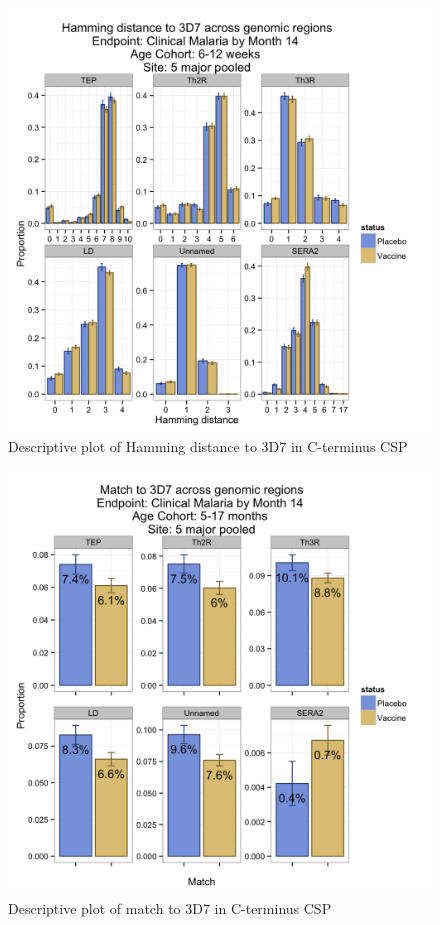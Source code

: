 \documentclass[]{article}
\begin{document}
\begin{figure}[htbp]
\centering
\includegraphics{figures/hamming-newborn-c-1.png}
\caption{Descriptive plot of Hamming distance to 3D7 in C-terminus CSP}
\end{figure}

\begin{figure}[htbp]
\centering
\includegraphics{figures/match-infant-c-1.png}
\caption{Descriptive plot of match to 3D7 in C-terminus CSP}
\end{figure}
\end{document}
